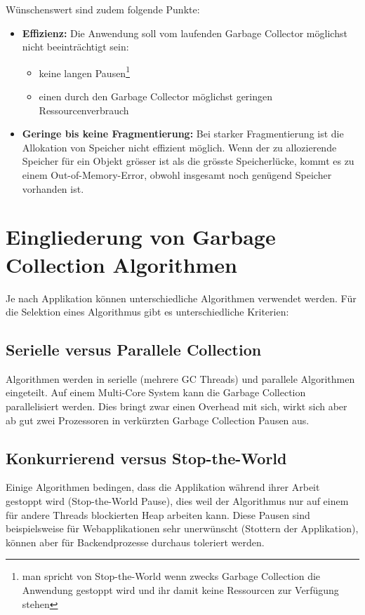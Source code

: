 Wünschenswert sind zudem folgende Punkte\cite[S. 4]{sunMemoryManagementWP}:
\begin{itemize}
	\item \textbf{Effizienz:} Die Anwendung soll vom laufenden Garbage Collector möglichst nicht beeinträchtigt sein: 
		\begin{itemize}
			\item keine langen Pausen\footnote{man spricht von Stop-the-World wenn zwecks Garbage Collection die Anwendung gestoppt wird und ihr damit keine Ressourcen zur Verfügung stehen}
			\item einen durch den Garbage Collector möglichst geringen Ressourcenverbrauch
		\end{itemize}
	\item \textbf{Geringe bis keine Fragmentierung:} Bei starker Fragmentierung ist die Allokation von Speicher nicht effizient möglich. Wenn der zu allozierende Speicher für ein Objekt grösser ist als die grösste Speicherlücke, kommt es zu einem Out-of-Memory-Error, obwohl insgesamt noch genügend Speicher vorhanden ist. 
\end{itemize}

\section{Eingliederung von Garbage Collection Algorithmen}
Je nach Applikation können unterschiedliche Algorithmen verwendet werden. Für die Selektion eines Algorithmus gibt es unterschiedliche Kriterien\cite[S. 5]{sunMemoryManagementWP}:
\subsection{Serielle versus Parallele Collection}
Algorithmen werden in serielle (mehrere GC Threads) und parallele Algorithmen eingeteilt.
Auf einem Multi-Core System kann die Garbage Collection parallelisiert werden. Dies bringt zwar einen Overhead mit sich, wirkt sich aber ab gut zwei Prozessoren in verkürzten Garbage Collection Pausen aus.

\subsection{Konkurrierend versus Stop-the-World}
Einige Algorithmen bedingen, dass die Applikation während ihrer Arbeit gestoppt wird (Stop-the-World Pause), dies weil der Algorithmus nur auf einem für andere Threads blockierten Heap arbeiten kann. Diese Pausen sind beispielsweise für Webapplikationen sehr unerwünscht (Stottern der Applikation), können aber für Backendprozesse durchaus toleriert werden.


